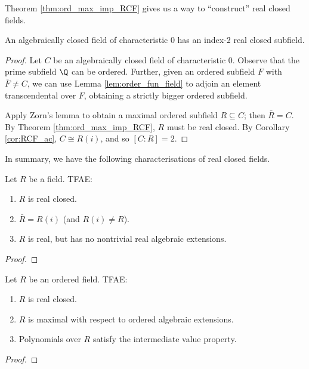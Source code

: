 Theorem \ref{thm:ord_max_imp_RCF} gives us a way to ``construct'' real closed fields.

\begin{lemma}
  \label{lem:ACF_ind_2_RCF}
  An algebraically closed field of characteristic 0 has an index-2 real closed subfield.
\end{lemma}
\begin{proof}
  Let $C$ be an algebraically closed field of characteristic 0. Observe that the prime subfield $\Q$ can be ordered. Further, given an ordered subfield $F$ with $\bar{F}\neq C$, we can use Lemma \ref{lem:order_fun_field} to adjoin an element transcendental over $F$, obtaining a strictly bigger ordered subfield.
  
  Apply Zorn's lemma to obtain a maximal ordered subfield $R\subseteq C$; then $\bar{R}=C$. By Theorem \ref{thm:ord_max_imp_RCF}, $R$ must be real closed. By Corollary \ref{cor:RCF_ac}, $C\cong R(i)$, and so $[C:R]=2$.
\end{proof}

In summary, we have the following characterisations of real closed fields.

\begin{theorem}
  \label{thm:RCF_tfae}
  Let $R$ be a field. TFAE:
  \begin{enumerate}
    \item $R$ is real closed.
    \item $\bar{R}=R(i)$ (and $R(i)\neq R$).
    \item $R$ is real, but has no nontrivial real algebraic extensions.
  \end{enumerate}
\end{theorem}
\begin{proof}
\end{proof}

\begin{theorem}
  \label{thm:RCF_tfae_ord}
  \leanok
  Let $R$ be an ordered field. TFAE:
  \begin{enumerate}
    \item $R$ is real closed.
    \item $R$ is maximal with respect to ordered algebraic extensions.
    \item Polynomials over $R$ satisfy the intermediate value property.
  \end{enumerate}
\end{theorem}
\begin{proof}
  \leanok
\end{proof}


